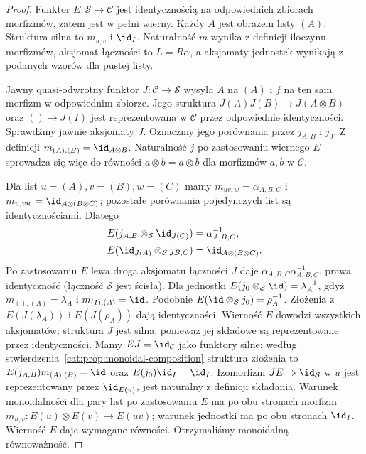 \begin{proof}
Funktor $E:\mathcal S\to\mathcal C$ jest identycznością na odpowiednich zbiorach morfizmów, zatem jest w pełni wierny. Każdy $A$ jest obrazem listy $(A)$. Struktura silna to $m_{u,v}$ i $\id_I$. Naturalność $m$ wynika z definicji iloczynu morfizmów, aksjomat łączności to $L=R\alpha$, a aksjomaty jednostek wynikają z podanych wzorów dla pustej listy.

Jawny quasi-odwrotny funktor $J:\mathcal C\to\mathcal S$ wysyła $A$ na $(A)$ i $f$ na ten sam morfizm w odpowiednim zbiorze. Jego struktura $J(A)J(B)\to J(A\otimes B)$ oraz $()\to J(I)$ jest reprezentowana w $\mathcal C$ przez odpowiednie identyczności. Sprawdźmy jawnie aksjomaty $J$. Oznaczmy jego porównania przez $j_{A,B}$ i $j_0$. Z definicji $m_{(A),(B)}=\id_{A\otimes B}$. Naturalność $j$ po zastosowaniu wiernego $E$ sprowadza się więc do równości $a\otimes b=a\otimes b$ dla morfizmów $a,b$ w $\mathcal C$.

Dla list $u=(A),v=(B),w=(C)$ mamy $m_{uv,w}=\alpha_{A,B,C}$ i $m_{u,vw}=\id_{A\otimes(B\otimes C)}$; pozostałe porównania pojedynczych list są identycznościami. Dlatego
\[
\begin{aligned}
E(j_{A,B}\otimes_{\mathcal S}\id_{J(C)})&=\alpha_{A,B,C}^{-1},\\
E(\id_{J(A)}\otimes_{\mathcal S}j_{B,C})&=\id_{A\otimes(B\otimes C)}.
\end{aligned}
\]
Po zastosowaniu $E$ lewa droga aksjomatu łączności $J$ daje $\alpha_{A,B,C}\alpha_{A,B,C}^{-1}$, prawa identyczność (łączność $\mathcal S$ jest ścisła). Dla jednostki $E(j_0\otimes_{\mathcal S}\id)=\lambda_A^{-1}$, gdyż $m_{(),(A)}=\lambda_A$ i $m_{(I),(A)}=\id$. Podobnie $E(\id\otimes_{\mathcal S}j_0)=\rho_A^{-1}$. Złożenia z $E(J(\lambda_A))$ i $E(J(\rho_A))$ dają identyczności. Wierność $E$ dowodzi wszystkich aksjomatów; struktura $J$ jest silna, ponieważ jej składowe są reprezentowane przez identyczności. Mamy $EJ=\id_{\mathcal C}$ jako funktory silne: według stwierdzenia~\ref{cat:prop:monoidal-composition} struktura złożenia to $E(j_{A,B})m_{(A),(B)}=\id$ oraz $E(j_0)\id_I=\id_I$. Izomorfizm $JE\Rightarrow\id_{\mathcal S}$ w $u$ jest reprezentowany przez $\id_{E(u)}$, jest naturalny z definicji składania. Warunek monoidalności dla pary list po zastosowaniu $E$ ma po obu stronach morfizm $m_{u,v}:E(u)\otimes E(v)\to E(uv)$; warunek jednostki ma po obu stronach $\id_I$. Wierność $E$ daje wymagane równości. Otrzymaliśmy monoidalną równoważność.
\end{proof}

